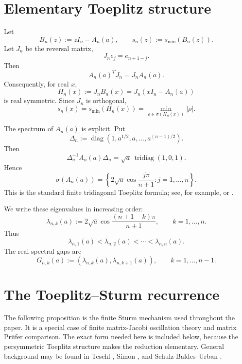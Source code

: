 \documentclass[11pt]{amsart}
\numberwithin{equation}{section}
\DeclareMathOperator{\tridiag}{tridiag}
\DeclareMathOperator{\diag}{diag}
\newcommand{\A}{A}
\newcommand{\B}{B}
\newcommand{\J}{J}
\begin{document}
\section{Elementary Toeplitz structure}

Let
\[
\B_n(z):=zI_n-\A_n(a),
\qquad
s_n(z):=s_{\min}(\B_n(z)).
\]
Let \(\J_n\) be the reversal matrix,
\[
\J_n e_j=e_{n+1-j}.
\]
Then
\[
\A_n(a)^T\J_n=\J_n\A_n(a).
\]
Consequently, for real \(x\),
\[
H_n(x):=\J_n\B_n(x)=\J_n(xI_n-\A_n(a))
\]
is real symmetric.  Since \(\J_n\) is orthogonal,
\[
s_n(x)
=
s_{\min}(H_n(x))
=
\min_{\rho\in\sigma(H_n(x))}|\rho|.
\tag{2.1}\label{eq:real-axis-smin}
\]

The spectrum of \(\A_n(a)\) is explicit.  Put
\[
\Delta_n:=\diag(1,a^{1/2},a,\dots,a^{(n-1)/2}).
\]
Then
\[
\Delta_n^{-1}\A_n(a)\Delta_n
=
\sqrt a\,\tridiag(1,0,1).
\]
Hence
\[
\sigma(\A_n(a))
=
\left\{
2\sqrt a\cos\frac{j\pi}{n+1}:j=1,\dots,n
\right\}.
\tag{2.2}\label{eq:toeplitz-spectrum}
\]
This is the standard finite tridiagonal Toeplitz formula; see, for example, \cite[Sec.~2]{NoschesePasquiniReichel2013} or \cite[Ch.~1]{BottcherGrudsky2005}.

We write these eigenvalues in increasing order:
\[
\lambda_{n,k}(a)
:=
2\sqrt a\cos\frac{(n+1-k)\pi}{n+1},
\qquad k=1,\dots,n.
\]
Thus
\[
\lambda_{n,1}(a)<\lambda_{n,2}(a)<\cdots<\lambda_{n,n}(a).
\]
The real spectral gaps are
\[
G_{n,k}(a)
:=
(\lambda_{n,k}(a),\lambda_{n,k+1}(a)),
\qquad k=1,\dots,n-1.
\]

\section{The Toeplitz--Sturm recurrence}

The following proposition is the finite Sturm mechanism used throughout the paper.  It is a special case of finite matrix-Jacobi oscillation theory and matrix Pr\"ufer comparison.  The exact form needed here is included below, because the persymmetric Toeplitz structure makes the reduction elementary.  General background may be found in Teschl \cite[Chs.~4--5]{Teschl2000}, Simon \cite{Simon2005}, and Schulz-Baldes--Urban \cite[Secs.~2--3]{SchulzBaldesUrban2020}.
\end{document}
